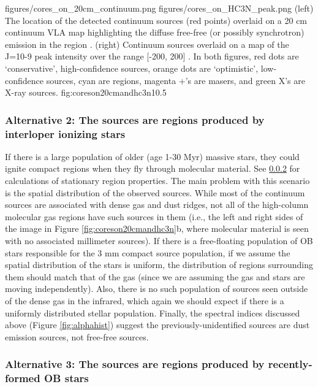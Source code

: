 \documentclass[twocolumn]{aastex61}
\begin{document}
\FigureTwo
{figures/cores_on_20cm_continuum.png}
{figures/cores_on_HC3N_peak.png}
{(left) The location of the detected continuum sources (red points) overlaid on a 20
cm continuum VLA map highlighting the diffuse free-free (or possibly
synchrotron) emission in the region \citep{Yusef-Zadeh2004a}.
(right) Continuum sources overlaid on a map
of the \cyanoacetylene J=10-9 peak intensity over the range [-200, 200] \kms.
  In both figures, red
dots are `conservative',
high-confidence sources, orange dots are `optimistic', low-confidence sources,
cyan are \hii regions, magenta +'s are masers, and green X's are X-ray sources.
}
{fig:coreson20cmandhc3n}{1}{0.5\textwidth}

\subsubsection{Alternative 2: The sources are \hii regions produced by
interloper ionizing stars}
\label{sec:alt2}
If there is a large population of older (age 1-30 Myr) massive stars, they could
ignite compact \hii regions when they fly through molecular material.  See
\ref{sec:theyarehiiregions} for calculations of stationary \hii region
properties.  The main problem with this scenario is the spatial distribution of
the observed sources.  While most of the continuum sources are associated with
dense gas and dust ridges, not all of the high-column molecular gas regions
have such sources in them (i.e., the left and right sides of the image in
Figure \ref{fig:coreson20cmandhc3n}b, where molecular material is seen with no
associated millimeter sources).  If there is a free-floating population of OB
stars responsible for the 3 mm compact source population, if we assume the
spatial distribution of the stars is uniform, the distribution of \hii regions
surrounding them should match that of the gas (since we are assuming the gas and
stars are moving independently).  Also, there is no such population of sources
seen outside of the dense gas in the infrared,
which again we should expect if there is a uniformly distributed stellar
population.  Finally, the spectral indices discussed above (Figure
\ref{fig:alphahist}) suggest the previously-unidentified sources are dust
emission sources, not
free-free sources.



\subsubsection{Alternative 3: The sources are \hii regions produced by
recently-formed OB stars}
\label{sec:theyarehiiregions}
\end{document}
